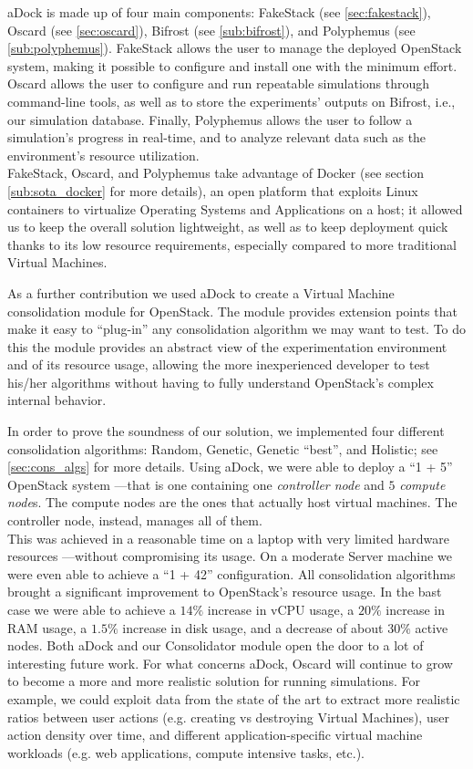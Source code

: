 aDock is made up of four main components: FakeStack (see \ref{sec:fakestack}), Oscard (see \ref{sec:oscard}), Bifrost (see \ref{sub:bifrost}), and Polyphemus (see \ref{sub:polyphemus}). FakeStack allows the user to manage the deployed OpenStack system, making it possible to configure and install one with the minimum effort. Oscard allows the user to configure and run repeatable simulations through command-line tools, as well as to store the experiments' outputs on Bifrost, i.e., our simulation database. Finally, Polyphemus allows the user to follow a simulation's progress in real-time, and to analyze relevant data such as the environment's resource utilization.\\
FakeStack, Oscard, and Polyphemus take advantage of Docker (see section \ref{sub:sota_docker} for more details), an open platform that exploits Linux containers to virtualize Operating Systems and Applications on a host; it allowed us to keep the overall solution lightweight, as well as to keep deployment quick thanks to its low resource requirements, especially compared to more traditional Virtual Machines.

As a further contribution we used aDock to create a Virtual Machine consolidation module for OpenStack. The module provides extension points that make it easy to ``plug-in'' any consolidation algorithm we may want to test. To do this the module provides an abstract view of the experimentation environment and of its resource usage, allowing the more inexperienced developer to test his/her algorithms without having to fully understand OpenStack's complex internal behavior.

In order to prove the soundness of our solution, we implemented four different consolidation algorithms: Random, Genetic, Genetic ``best'', and Holistic; see \ref{sec:cons_algs} for more details. Using aDock, we were able to deploy a ``1 + 5'' OpenStack system ---that is one containing one \textit{controller node} and $5$ \textit{compute node}s. The compute nodes are the ones that actually host virtual machines. The controller node, instead, manages all of them.\\
This was achieved in a reasonable time on a laptop with very limited hardware resources ---without compromising its usage. On a moderate Server machine we were even able to achieve a ``1 + 42'' configuration. All consolidation algorithms brought a significant improvement to OpenStack's resource usage. In the bast case we were able to achieve a $14\%$ increase in vCPU usage, a $20\%$ increase in RAM usage, a $1.5\%$ increase in disk usage, and a decrease of about $30\%$ active nodes. 
Both aDock and our Consolidator module open the door to a lot of interesting future work. For what concerns aDock, Oscard will continue to grow to become a more and more realistic solution for running simulations. For example, we could exploit data from the state of the art to extract more realistic ratios between user actions (e.g. creating vs destroying Virtual Machines), user action density over time, and different application-specific virtual machine workloads (e.g. web applications, compute intensive tasks, etc.).

